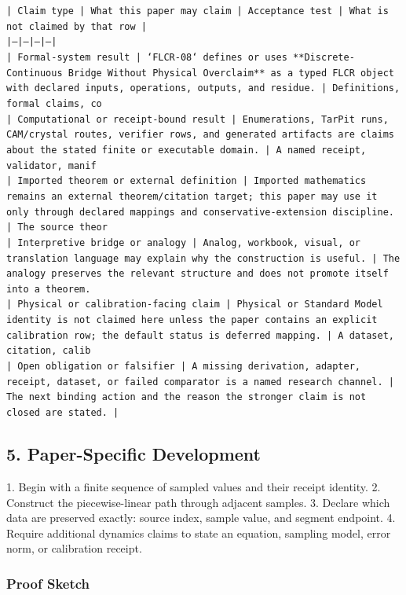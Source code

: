 \documentclass[11pt]{article}
\begin{document}
\noindent\texttt{| Claim type | What this paper may claim | Acceptance test | What is not claimed by that row |}\\
\noindent\texttt{|---|---|---|---|}\\
\noindent\texttt{| Formal-system result | `FLCR-08` defines or uses **Discrete-Continuous Bridge Without Physical Overclaim** as a typed FLCR object with declared inputs, operations, outputs, and residue. | Definitions, formal claims, co}\\
\noindent\texttt{| Computational or receipt-bound result | Enumerations, TarPit runs, CAM/crystal routes, verifier rows, and generated artifacts are claims about the stated finite or executable domain. | A named receipt, validator, manif}\\
\noindent\texttt{| Imported theorem or external definition | Imported mathematics remains an external theorem/citation target; this paper may use it only through declared mappings and conservative-extension discipline. | The source theor}\\
\noindent\texttt{| Interpretive bridge or analogy | Analog, workbook, visual, or translation language may explain why the construction is useful. | The analogy preserves the relevant structure and does not promote itself into a theorem. }\\
\noindent\texttt{| Physical or calibration-facing claim | Physical or Standard Model identity is not claimed here unless the paper contains an explicit calibration row; the default status is deferred mapping. | A dataset, citation, calib}\\
\noindent\texttt{| Open obligation or falsifier | A missing derivation, adapter, receipt, dataset, or failed comparator is a named research channel. | The next binding action and the reason the stronger claim is not closed are stated. | }\\

\subsection*{5. Paper-Specific Development}

1. Begin with a finite sequence of sampled values and their receipt identity.
2. Construct the piecewise-linear path through adjacent samples.
3. Declare which data are preserved exactly: source index, sample value, and segment endpoint.
4. Require additional dynamics claims to state an equation, sampling model, error norm, or calibration receipt.

\subsubsection*{Proof Sketch}
\end{document}
